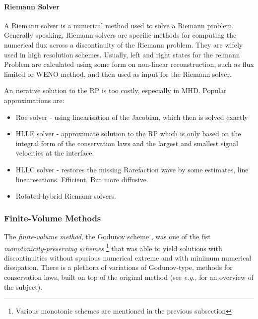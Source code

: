 \paragraph{Riemann Solver}

A Riemann solver is a numerical method used to solve a Riemann problem. 
Generally speaking, Riemann solvers are specific methods for computing the numerical flux across a discontinuity of the Riemann problem. 
They are wifely used in high resolution schemes. 
Usually, left and right states for the reimann Problem are calculated using some form on non-linear reconstruction, such as flux limited or WENO method, and then used as input for the Riemann solver.

An iterative solution to the RP is too costly, especially in MHD. 
Popular approximations are:

\begin{itemize}
    \item Roe solver - using linearisation of the Jacobian, which then is solved exactly 
    \item HLLE solver - approximate solution to the RP which is only based on the integral form of the conservation laws and the largest and smallest signal velocities at the interface.
    \item HLLC solver - restores the missing Rarefaction wave by some estimates, line linearesations. Efficient, But more diffusive. 
    \item Rotated-hybrid Riemann solvers. 
\end{itemize}


\subsubsection{Finite-Volume Methods}


The \textit{finite-volume method}, the Godunov scheme \cite{Godunov:1959}, was one of the fist \textit{monotonicity-preserving schemes} 
\footnote{Various monotonic schemes are mentioned in the previous subsection} 
that was able to yield solutions with discontinuities without spurious numerical extreme and with minimum numerical dissipation. 
There is a plethora of variations of Godunov-type, methods for conservation laws, built on top of the original method (see \textit{e.g.,} \cite{Toro:1999} for an overview of the subject).



